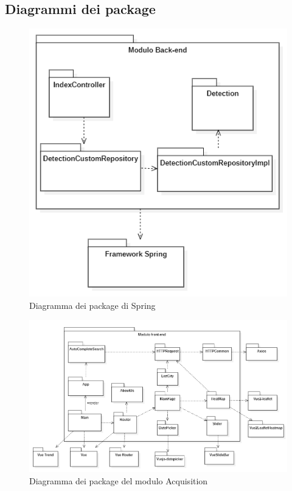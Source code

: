 \subsection{Diagrammi dei package}
\begin{figure}[!h]
  \begin{center}
    \includegraphics[width=1\linewidth]{../immagini/diag_PB/diag_pack_spring.png}
    \caption{Diagramma dei package di Spring}
  \end{center}
\end{figure}

\begin{figure}[!h]
  \begin{center}
    \includegraphics[width=1\linewidth]{../immagini/diag_PB/diag_pack_vue.png}
    \caption{Diagramma dei package del modulo Acquisition}
  \end{center}
\end{figure}


